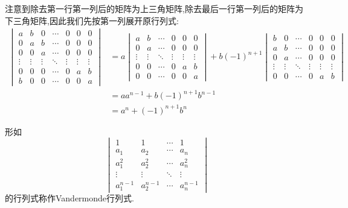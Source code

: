 \documentclass{ctexart}
\begin{document}
\begin{solution}
    注意到除去第一行第一列后的矩阵为上三角矩阵,除去最后一行第一列后的矩阵为下三角矩阵,因此我们先按第一列展开原行列式:
    \[\begin{aligned}
        \begin{vmatrix}
            a&b&0&\cdots&0&0&0\\
            0&a&b&\cdots&0&0&0\\
            0&0&a&\cdots&0&0&0\\
            \vdots&\vdots&\vdots&\ddots&\vdots&\vdots&\vdots\\
            0&0&0&\cdots&0&a&b\\
            b&0&0&\cdots&0&0&a
        \end{vmatrix}
        &= a\begin{vmatrix}
            a&b&\cdots&0&0&0\\
            0&a&\cdots&0&0&0\\
            \vdots&\vdots&\ddots&\vdots&\vdots&\vdots\\
            0&0&\cdots&0&a&b\\
            0&0&\cdots&0&0&a
        \end{vmatrix}+b(-1)^{n+1}\begin{vmatrix}
            b&0&\cdots&0&0&0\\
            a&b&\cdots&0&0&0\\
            0&a&\cdots&0&0&0\\
            \vdots&\vdots&\ddots&\vdots&\vdots&\vdots\\
            0&0&\cdots&0&a&b
        \end{vmatrix}\\
        &= aa^{n-1}+b(-1)^{n+1}b^{n-1} \\
        &= a^n+(-1)^{n+1}b^n
    \end{aligned}\]
\end{solution}
\begin{definition}[Vandermonde行列式]
    形如
    \[\begin{vmatrix}
        1&1&\cdots&1\\
        a_1&a_2&\cdots&a_n\\
        a_1^2&a_2^2&\cdots&a_n^2\\
        \vdots&\vdots&\ddots&\vdots\\
        a_1^{n-1}&a_2^{n-1}&\cdots&a_n^{n-1}
    \end{vmatrix}\]
    的行列式称作Vandermonde行列式.
\end{definition}
\end{document}
